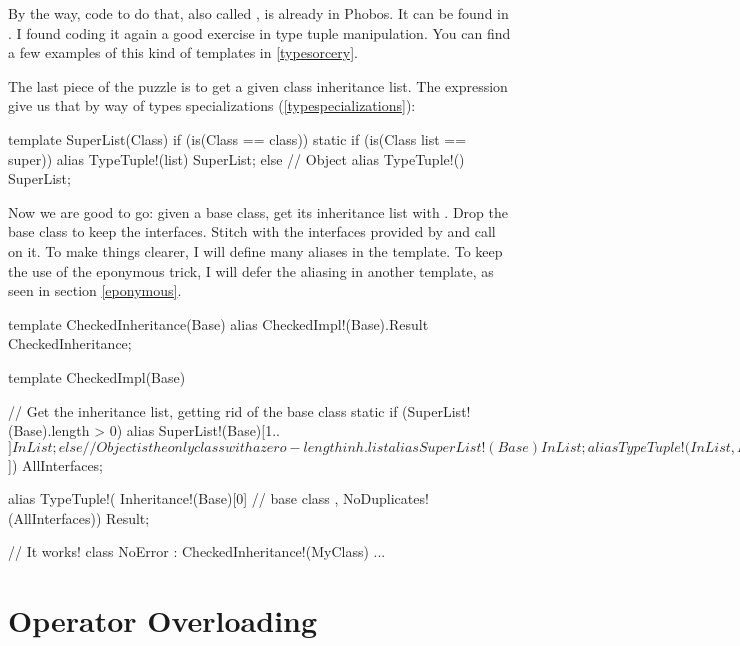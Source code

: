 By the way, code to do that, also called , is already in Phobos. It can be found in . I found coding it again a good exercise in type tuple manipulation. You can find a few examples of this kind of templates in \autoref{typesorcery}.

The last piece of the puzzle is to get a given class inheritance list. The  expression give us that by way of types specializations (\ref{typespecializations}):

\begin{dcode}
template SuperList(Class) if (is(Class == class))
{
    static if (is(Class list == super))
        alias TypeTuple!(list) SuperList;
    else // Object
        alias TypeTuple!() SuperList;
}
\end{dcode}

Now we are good to go: given a base class, get its inheritance list with . Drop the base class to keep the interfaces. Stitch with the interfaces provided by  and call  on it. To make things clearer, I will define many aliases in the template. To keep the use of the eponymous trick, I will defer the aliasing in another template, as seen in section \ref{eponymous}.

\begin{dcode}
template CheckedInheritance(Base)
{
    alias CheckedImpl!(Base).Result CheckedInheritance;
}

template CheckedImpl(Base)
{
    // Get the inheritance list, getting rid of the base class
    static if (SuperList!(Base).length > 0)
        alias SuperList!(Base)[1..$] InList;
    else // Object is the only class with a zero-length inh. list
        alias SuperList!(Base)       InList;

    alias TypeTuple!( InList
                    , Inheritance!(Base)[1..$]) AllInterfaces;

    alias TypeTuple!( Inheritance!(Base)[0] // base class
                    , NoDuplicates!(AllInterfaces)) Result;
} 

// It works!
class NoError : CheckedInheritance!(MyClass) { ... }
\end{dcode}


\section{Operator Overloading} \label{operatoroverloading}

